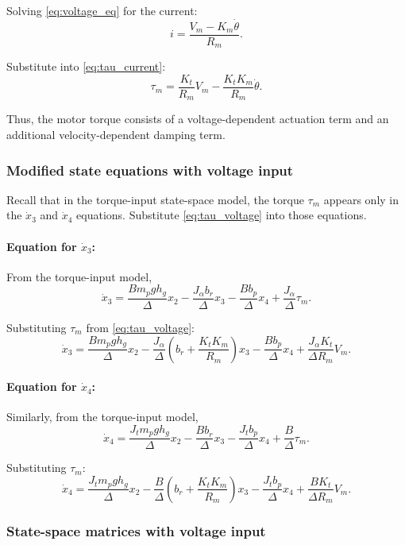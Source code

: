 \documentclass[12pt,a4paper]{article}
\begin{document}
Solving \eqref{eq:voltage_eq} for the current:
\[
i = \frac{V_m - K_m\dot\theta}{R_m}.
\]

Substitute into \eqref{eq:tau_current}:
\begin{equation}
\boxed{
\tau_m
=
\frac{K_t}{R_m}V_m
-
\frac{K_t K_m}{R_m}\dot\theta.
}
\label{eq:tau_voltage}
\end{equation}

Thus, the motor torque consists of a voltage-dependent actuation term and an additional velocity-dependent damping term.

\subsubsection{Modified state equations with voltage input}

Recall that in the torque-input state-space model,
the torque $\tau_m$ appears only in the $\dot x_3$ and $\dot x_4$ equations.
Substitute \eqref{eq:tau_voltage} into those equations.

\paragraph{Equation for $\dot x_3$:}

From the torque-input model,
\[
\dot x_3
=
\frac{B m_p g h_g}{\Delta}x_2
-\frac{J_\alpha b_r}{\Delta}x_3
-\frac{B b_p}{\Delta}x_4
+\frac{J_\alpha}{\Delta}\tau_m.
\]

Substituting $\tau_m$ from \eqref{eq:tau_voltage}:
\[
\dot x_3
=
\frac{B m_p g h_g}{\Delta}x_2
-\frac{J_\alpha}{\Delta}\!\left(b_r+\frac{K_t K_m}{R_m}\right)x_3
-\frac{B b_p}{\Delta}x_4
+\frac{J_\alpha K_t}{\Delta R_m}V_m.
\]

\paragraph{Equation for $\dot x_4$:}

Similarly, from the torque-input model,
\[
\dot x_4
=
\frac{J_t m_p g h_g}{\Delta}x_2
-\frac{B b_r}{\Delta}x_3
-\frac{J_t b_p}{\Delta}x_4
+\frac{B}{\Delta}\tau_m.
\]

Substituting $\tau_m$:
\[
\dot x_4
=
\frac{J_t m_p g h_g}{\Delta}x_2
-\frac{B}{\Delta}\!\left(b_r+\frac{K_t K_m}{R_m}\right)x_3
-\frac{J_t b_p}{\Delta}x_4
+\frac{B K_t}{\Delta R_m}V_m.
\]

\subsubsection{State-space matrices with voltage input}
\end{document}
